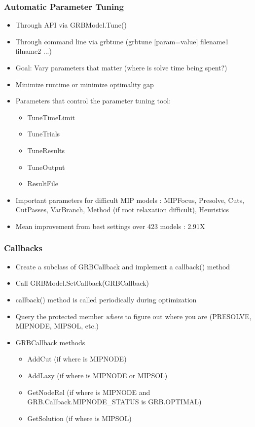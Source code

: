 \documentclass[12pt,handout]{beamer}
\begin{document}
\begin{frame}
\frametitle{Automatic Parameter Tuning}
\begin{itemize}
\item Through API via GRBModel.Tune()
\item Through command line via grbtune (grbtune [param=value] filename1 filname2 ...)
\item Goal: Vary parameters that matter (where is solve time being spent?)
\item Minimize runtime or minimize optimality gap
\item Parameters that control the parameter tuning tool:
    \begin{itemize}
    \item TuneTimeLimit
    \item TuneTrials
    \item TuneResults
    \item TuneOutput
    \item ResultFile
    \end{itemize}
\item Important parameters for difficult MIP models : MIPFocus, Presolve, Cuts, CutPasses, VarBranch, Method (if root relaxation difficult), Heuristics
\item Mean improvement from best settings over 423 models : 2.91X
\end{itemize}
\end{frame}

\begin{frame}
\frametitle{Callbacks}
\begin{itemize}
\item Create a subclass of GRBCallback and implement a callback() method
\item Call GRBModel.SetCallback(GRBCallback)
\item callback() method is called periodically during optimization
\item Query the protected member {\em where} to figure out where you are (PRESOLVE, MIPNODE, MIPSOL, etc.)
\item GRBCallback methods
    \begin{itemize}
    \item AddCut (if where is MIPNODE)
    \item AddLazy (if where is MIPNODE or MIPSOL)
    \item GetNodeRel (if where is MIPNODE and GRB.Callback.MIPNODE\_STATUS is GRB.OPTIMAL)
    \item GetSolution (if where is MIPSOL)
    \end{itemize}
\end{itemize}
\end{frame}
\end{document}

